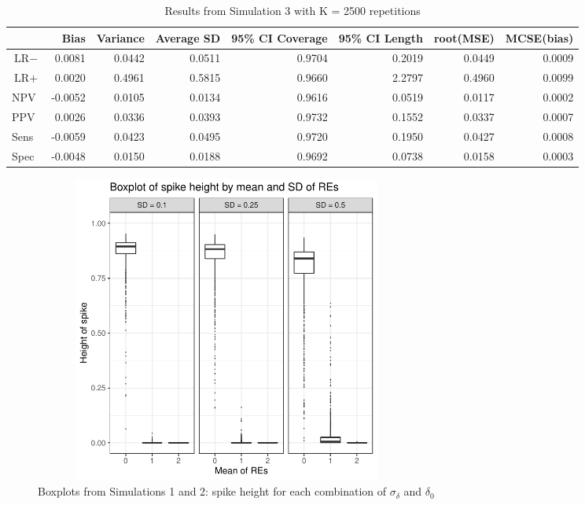 \documentclass[AMA,STIX1COL]{WileyNJD-v2}
\begin{document}
\clearpage

\begin{table}[ht]
\centering
\begin{tabular}{lrrrrrrr}
  \hline
 & Bias & Variance & Average SD & 95\% CI Coverage & 95\% CI Length & root(MSE) & MCSE(bias) \\ 
  \hline
$\mbox{LR}-$ & 0.0081 & 0.0442 & 0.0511 & 0.9704 & 0.2019 & 0.0449 & 0.0009 \\ 
  $\mbox{LR}+$ & 0.0020 & 0.4961 & 0.5815 & 0.9660 & 2.2797 & 0.4960 & 0.0099 \\ 
  NPV & -0.0052 & 0.0105 & 0.0134 & 0.9616 & 0.0519 & 0.0117 & 0.0002 \\ 
  PPV & 0.0026 & 0.0336 & 0.0393 & 0.9732 & 0.1552 & 0.0337 & 0.0007 \\ 
  Sens & -0.0059 & 0.0423 & 0.0495 & 0.9720 & 0.1950 & 0.0427 & 0.0008 \\ 
  Spec & -0.0048 & 0.0150 & 0.0188 & 0.9692 & 0.0738 & 0.0158 & 0.0003 \\ 
   \hline
\end{tabular}
\caption{Results from Simulation 3 with K = 2500 repetitions} 
\label{table:CTSs}
\end{table}



\begin{figure}
\includegraphics[height = 4in, width = 5in]{spike_boxplot.pdf}
\caption{Boxplots from Simulations 1 and 2: spike height for each combination of $\sigma_\delta$ and $\delta_0$}
\label{fig:SSP-boxplot}
\end{figure}
\end{document}
